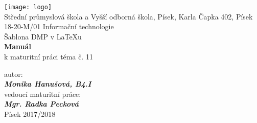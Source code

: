 \documentclass[a4paper, 12pt]{report}
\begin{document}
	\begin{titlepage}
		\begin{center}
			\texttt{[image: logo]}\\[2mm]
			Střední průmyslová škola a Vyšší odborná škola, Písek, Karla Čapka 402, Písek\\[2mm]
			18-20-M/01 Informační technologie\\[1,2cm]
			\Huge Šablona DMP v \LaTeX u\\[6mm]
			{\textbf{\Huge{Manuál}}}\\[2mm]
			\normalsize k maturitní práci téma č. 11
		\end{center}
		\vfill
		\noindent autor:\\
		\emph{\bf Monika Hanušová, B4.I}\\[2mm]
		vedoucí maturitní práce:\\
		\emph{\bf Mgr. Radka Pecková}\\[8mm]
		Písek 2017/2018
	\end{titlepage}

	\obsah
\end{document}
